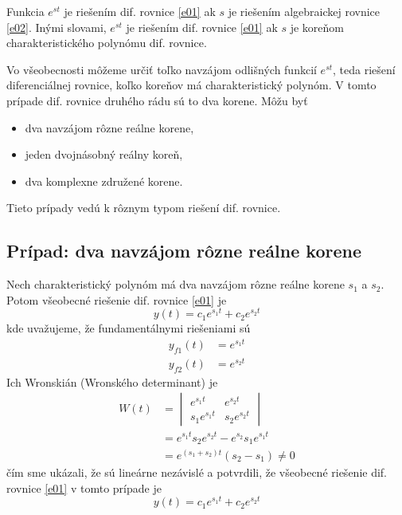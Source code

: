 \documentclass[a4paper, 10pt, ]{article}
\begin{document}
Funkcia $e^{s t}$ je riešením dif. rovnice \eqref{e01} ak $s$ je riešením algebraickej rovnice \eqref{e02}. Inými slovami, $e^{s t}$ je riešením dif. rovnice \eqref{e01} ak $s$ je koreňom charakteristického polynómu dif. rovnice. 


Vo všeobecnosti môžeme určiť toľko navzájom odlišných funkcií $e^{s t}$, teda riešení diferenciálnej rovnice, koľko koreňov má charakteristický polynóm. V tomto prípade dif. rovnice druhého rádu sú to dva korene. Môžu byť
\begin{itemize}
    \item dva navzájom rôzne reálne korene,
    \item jeden dvojnásobný reálny koreň,
    \item dva komplexne združené korene.
\end{itemize}
Tieto prípady vedú k rôznym typom riešení dif. rovnice.








\subsection{Prípad: dva navzájom rôzne reálne korene}


Nech charakteristický polynóm má dva navzájom rôzne reálne korene $s_1$ a $s_2$. Potom všeobecné riešenie dif. rovnice \eqref{e01} je
\begin{equation}
    y(t) = c_1 e^{s_1 t} + c_2 e^{s_2 t}
\end{equation}
kde uvažujeme, že fundamentálnymi riešeniami sú
\begin{subequations} \label{kfunr}
    \begin{align}
        y_{f1}(t) &= e^{s_1 t} \\
        y_{f2}(t) &= e^{s_2 t}
    \end{align} 
\end{subequations}
Ich Wronskián (Wronského determinant) je
\begin{equation}
    \begin{aligned}
        W(t) &= \begin{vmatrix}
            e^{s_1 t} & e^{s_2 t} \\
            s_1 e^{s_1 t} & s_2 e^{s_2 t}
        \end{vmatrix} \\
        &=e^{s_1t} s_2 e^{s_2t} - e^{s_2} s_1 e^{s_1t} \\
        &= e^{(s_1 + s_2) t} (s_2 - s_1) \neq 0
    \end{aligned}
\end{equation}
čím sme ukázali, že sú lineárne nezávislé a potvrdili, že všeobecné riešenie dif. rovnice \eqref{e01} v tomto prípade je
\begin{equation}
    y(t) = c_1 e^{s_1 t} + c_2 e^{s_2 t}
\end{equation}
\end{document}
